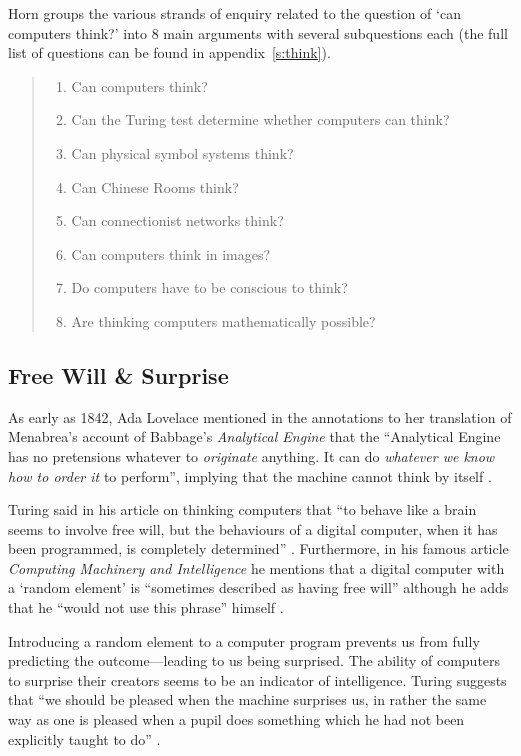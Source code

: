 Horn groups the various strands of enquiry related to the question of `can computers think?' into 8 main arguments with several subquestions each \autocite*{Horn2009} (the full list of questions can be found in appendix~\ref{s:think}). 

\begin{quotation}
  \begin{enumerate}
    \item Can computers think?
    \item Can the Turing test determine whether computers can think?
    \item Can physical symbol systems think?
    \item Can Chinese Rooms think?
    \item Can connectionist networks think?
    \item Can computers think in images?
    \item Do computers have to be conscious to think?
    \item Are thinking computers mathematically possible?
  \end{enumerate}
\end{quotation}


\subsection{Free Will \& Surprise}

As early as 1842, Ada Lovelace mentioned in the annotations to her translation of Menabrea's account of Babbage's \textit{Analytical Engine} that the ``Analytical Engine has no pretensions whatever to \emph{originate} anything. It can do \emph{whatever we know how to order it} to perform'', implying that the machine cannot think by itself \autocite[][her emphasis]{Menabrea1842}.

Turing said in his article on thinking computers that ``to behave like a brain seems to involve free will, but the behaviours of a digital computer, when it has been programmed, is completely determined'' \autocite*{Turing1951}. Furthermore, in his famous article \textit{Computing Machinery and Intelligence} he mentions that a digital computer with a `random element' is ``sometimes described as having free will'' although he adds that he ``would not use this phrase'' himself \autocite*{Turing2009}. 

Introducing a random element to a computer program prevents us from fully predicting the outcome---leading to us being surprised. The ability of computers to surprise their creators seems to be an indicator of intelligence. Turing suggests that ``we should be pleased when the machine surprises us, in rather the same way as one is pleased when a pupil does something which he had not been explicitly taught to do'' \autocite*{Turing1951}. 

